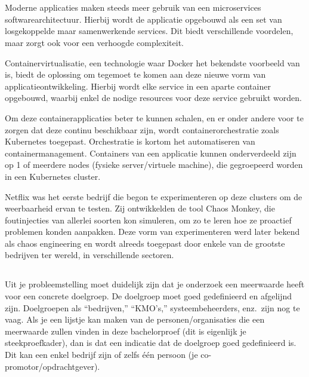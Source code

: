 
\chapter{}
\label{ch:inleiding}

Moderne applicaties maken steeds meer gebruik van een microservices softwarearchitectuur. Hierbij wordt de applicatie opgebouwd als een set van losgekoppelde maar samenwerkende services. Dit biedt verschillende voordelen, maar zorgt ook voor een verhoogde complexiteit. 

Containervirtualisatie, een technologie waar Docker het bekendste voorbeeld van is, biedt de oplossing om tegemoet te komen aan deze nieuwe vorm van applicatieontwikkeling. Hierbij wordt elke service in een aparte container opgebouwd, waarbij enkel de nodige resources voor deze service gebruikt worden. 

Om deze containerapplicaties beter te kunnen schalen, en er onder andere voor te zorgen dat deze continu beschikbaar zijn, wordt containerorchestratie zoals Kubernetes toegepast. Orchestratie is kortom het automatiseren van containermanagement. Containers van een applicatie kunnen onderverdeeld zijn op 1 of meerdere nodes (fysieke server/virtuele machine), die gegroepeerd worden in een Kubernetes cluster. 

Netflix was het eerste bedrijf die begon te experimenteren op deze clusters om de weerbaarheid ervan te testen. Zij ontwikkelden de tool Chaos Monkey, die foutinjecties van allerlei soorten kon simuleren, om zo te leren hoe ze proactief problemen konden aanpakken. Deze vorm van experimenteren werd later bekend als chaos engineering en wordt alreeds toegepast door enkele van de grootste bedrijven ter wereld, in verschillende sectoren.    

\section{}
\label{sec:probleemstelling}

Uit je probleemstelling moet duidelijk zijn dat je onderzoek een meerwaarde heeft voor een concrete doelgroep. De doelgroep moet goed gedefinieerd en afgelijnd zijn. Doelgroepen als ``bedrijven,'' ``KMO's,'' systeembeheerders, enz.~zijn nog te vaag. Als je een lijstje kan maken van de personen/organisaties die een meerwaarde zullen vinden in deze bachelorproef (dit is eigenlijk je steekproefkader), dan is dat een indicatie dat de doelgroep goed gedefinieerd is. Dit kan een enkel bedrijf zijn of zelfs één persoon (je co-promotor/opdrachtgever).

